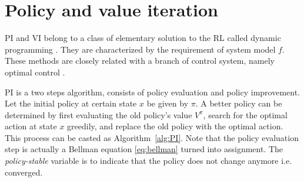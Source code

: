 \section{Policy and value iteration} \label{sec:value_iter}
\ac {PI} and \ac{VI} belong to a class of elementary solution to the \ac{RL} called  dynamic programming \cite{sutton1998reinforcement}. They are characterized by the requirement of system model $f$. These methods are closely related with a branch of control system, namely optimal control \cite{126844}.

\ac {PI} is a two steps algorithm, consists of policy evaluation and policy improvement. Let the initial policy at certain state $x$ be given by $ \pi$. A better policy can be determined by first evaluating the old policy's value $ V^{\pi} $, search for the optimal action at state $x$ greedily, and replace the old policy with the optimal action. This process can be casted as Algorithm~\ref{alg:PI}. Note that the policy evaluation step is actually a Bellman equation \eqref{eq:bellman} turned into assignment. The \textit{policy-stable} variable is to indicate that the policy does not change anymore i.e. converged.

